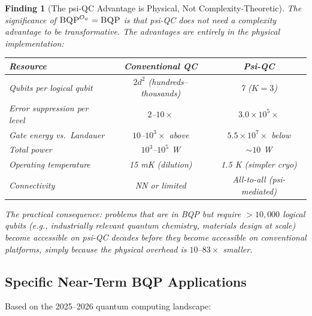 \documentclass[11pt]{article}
\newtheorem{finding}[theorem]{Finding}
\theoremstyle{definition}
\theoremstyle{remark}
\newcommand{\ee}[1]{\times 10^{#1}}
\newcommand{\BQP}{\textsc{BQP}}
\begin{document}
\begin{finding}[The psi-QC Advantage is Physical, Not Complexity-Theoretic]
\label{find:physical-advantage}
The significance of $\BQP^{O_\psi} = \BQP$ is that psi-QC does not
need a complexity advantage to be transformative. The advantages are
entirely in the physical implementation:

\begin{center}
\begin{tabular}{@{}lcc@{}}
\toprule
Resource & Conventional QC & Psi-QC \\
\midrule
Qubits per logical qubit & $2d^2$ (hundreds--thousands) & 7 ($K{=}3$) \\
Error suppression per level & $2$--$10\times$ & $3.0\ee{5}\times$ \\
Gate energy vs.\ Landauer & $10$--$10^3\times$ above & $5.5\ee{7}\times$ below \\
Total power & $10^3$--$10^5$ W & $\sim 10$ W \\
Operating temperature & 15 mK (dilution) & 1.5 K (simpler cryo) \\
Connectivity & NN or limited & All-to-all (psi-mediated) \\
\bottomrule
\end{tabular}
\end{center}

The practical consequence: problems that are in BQP but require
$>10{,}000$ logical qubits (e.g., industrially relevant quantum
chemistry, materials design at scale) become accessible on psi-QC
decades before they become accessible on conventional platforms, simply
because the physical overhead is $10$--$83\times$ smaller.
\end{finding}

\subsection{Specific Near-Term BQP Applications}
\label{sec:near-term-bqp}

Based on the 2025--2026 quantum computing landscape:
\end{document}
